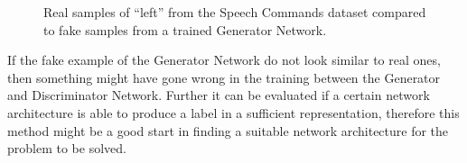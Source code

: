 \begin{figure}[!ht]
  \centering
  \caption{Real samples of \enquote{left} from the Speech Commands dataset compared to fake samples from a trained Generator Network.}
  \label{fig:nn_adv_gen}
\end{figure}
\FloatBarrier
\noindent

If the fake example of the Generator Network do not look similar to real ones, then something might have gone wrong in the training between the Generator and Discriminator Network.
Further it can be evaluated if a certain network architecture is able to produce a label in a sufficient representation, therefore this method might be a good start in finding a suitable network architecture for the problem to be solved.



